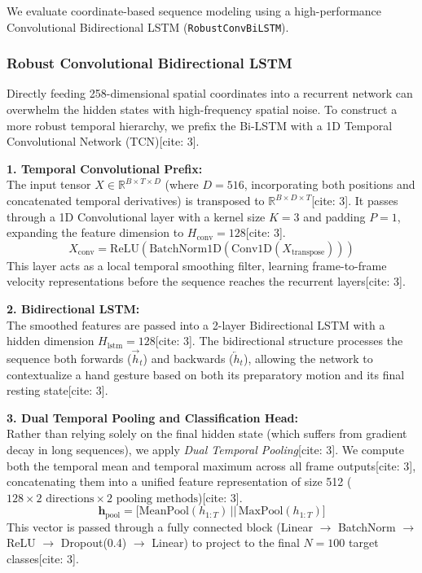 \documentclass[12pt,a4paper]{article}
\begin{document}
We evaluate coordinate-based sequence modeling using a high-performance Convolutional Bidirectional LSTM (\texttt{RobustConvBiLSTM}).

\subsubsection{Robust Convolutional Bidirectional LSTM}

Directly feeding 258-dimensional spatial coordinates into a recurrent network can overwhelm the hidden states with high-frequency spatial noise. To construct a more robust temporal hierarchy, we prefix the Bi-LSTM with a 1D Temporal Convolutional Network (TCN)[cite: 3].

\textbf{1. Temporal Convolutional Prefix:}\\
The input tensor $X \in \mathbb{R}^{B \times T \times D}$ (where $D=516$, incorporating both positions and concatenated temporal derivatives) is transposed to $\mathbb{R}^{B \times D \times T}$[cite: 3]. It passes through a 1D Convolutional layer with a kernel size $K=3$ and padding $P=1$, expanding the feature dimension to $H_{\text{conv}} = 128$[cite: 3]. 
\begin{equation}
X_{\text{conv}} = \text{ReLU}(\text{BatchNorm1D}(\text{Conv1D}(X_{\text{transpose}})))
\end{equation}
This layer acts as a local temporal smoothing filter, learning frame-to-frame velocity representations before the sequence reaches the recurrent layers[cite: 3].

\textbf{2. Bidirectional LSTM:}\\
The smoothed features are passed into a 2-layer Bidirectional LSTM with a hidden dimension $H_{\text{lstm}} = 128$[cite: 3]. The bidirectional structure processes the sequence both forwards ($\vec{h}_t$) and backwards ($\overleftarrow{h}_t$), allowing the network to contextualize a hand gesture based on both its preparatory motion and its final resting state[cite: 3].

\textbf{3. Dual Temporal Pooling and Classification Head:}\\
Rather than relying solely on the final hidden state (which suffers from gradient decay in long sequences), we apply \textit{Dual Temporal Pooling}[cite: 3]. We compute both the temporal mean and temporal maximum across all frame outputs[cite: 3], concatenating them into a unified feature representation of size 512 ($128 \times 2 \text{ directions} \times 2 \text{ pooling methods}$)[cite: 3].
\begin{equation}
\mathbf{h}_{\text{pool}} = \big[ \text{MeanPool}(h_{1:T}) \,||\, \text{MaxPool}(h_{1:T}) \big]
\end{equation}
This vector is passed through a fully connected block (Linear $\to$ BatchNorm $\to$ ReLU $\to$ Dropout(0.4) $\to$ Linear) to project to the final $N=100$ target classes[cite: 3].
\end{document}
